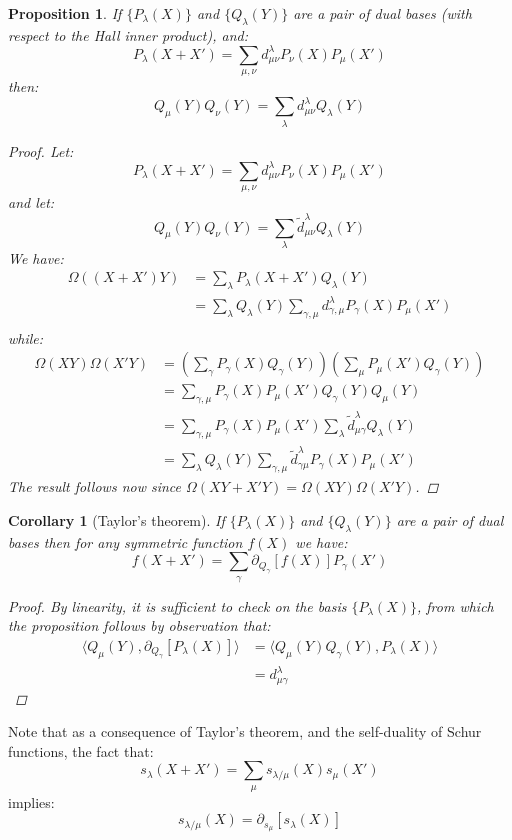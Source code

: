 \documentclass[12pt,dvips]{amsart}
\newtheorem{corollary}{Corollary}[section]
\newtheorem{proposition}{Proposition}[section]
\begin{document}
\begin{proposition} \label{dual}
If $\{P_\lambda(X)\}$ and $\{Q_\lambda(Y)\}$ are a pair of dual bases (with respect to the Hall inner product), and:
$$ P_\lambda(X + X') = \sum_{\mu, \nu} d^{\lambda}_{\mu \nu} P_\nu(X) P_\mu(X') $$
then:
$$ Q_\mu(Y) Q_\nu(Y) = \sum_\lambda d^{\lambda}_{\mu \nu} Q_\lambda(Y)$$

\begin{proof}
Let:
$$ P_\lambda(X + X') = \sum_{\mu, \nu} d^{\lambda}_{\mu \nu} P_\nu(X) P_\mu(X') $$
and let:
$$ Q_\mu(Y) Q_\nu(Y) = \sum_\lambda \tilde{d}^{\lambda}_{\mu \nu} Q_\lambda(Y)$$
We have:
\begin{align*}
\Omega((X + X')Y) & =  \sum_\lambda P_\lambda(X + X') Q_\lambda(Y) \\
& =  \sum_\lambda Q_\lambda(Y) %
\sum_{\gamma, \mu} d^{\lambda}_{\gamma,\mu} P_\gamma(X) P_\mu(X') %
\\
\end{align*}
while:
\begin{align*}
\Omega(XY)\Omega(X'Y) & =  \left ( \sum_\gamma P_\gamma(X) Q_\gamma(Y) \right ) \left ( \sum_\mu P_\mu(X') Q_\gamma(Y) \right ) \\
& =  \sum_{\gamma, \mu} P_\gamma(X) P_\mu(X') Q_\gamma(Y) Q_\mu(Y) \\
& =  \sum_{\gamma, \mu} P_\gamma(X) P_\mu(X') \sum_\lambda \tilde{d}^{\lambda}_{\mu \gamma} Q_\lambda(Y) \\
& =  \sum_\lambda Q_\lambda(Y) \sum_{\gamma, \mu} \tilde{d}^{\lambda}_{\gamma \mu} P_\gamma(X) P_\mu(X')
\end{align*}
The result follows now since $\Omega(XY + X'Y) = \Omega(XY)\Omega(X'Y)$.
\end{proof}
\end{proposition}

\begin{corollary}[Taylor's theorem]
If $\{P_\lambda(X)\}$ and $\{ Q_\lambda(Y) \}$ are a pair of dual bases then for any symmetric function $f(X)$ we have:
$$ f(X + X') = \sum_\gamma \partial_{Q_\gamma}[f(X)] P_\gamma(X') $$
\begin{proof}
By linearity, it is sufficient to check on the basis $\{P_\lambda(X)\}$, from which the proposition follows by observation that:
\begin{align*}
\langle Q_\mu(Y), \partial_{Q_\gamma}[P_\lambda(X)] \rangle
& =  \langle Q_\mu(Y) Q_\gamma(Y), P_\lambda(X) \rangle \\
& =  d^{\lambda}_{\mu \gamma}
\end{align*}
\qedhere
\end{proof}
\end{corollary}
\noindent
Note that as a consequence of Taylor's theorem, and the self-duality of Schur functions, the fact that:
$$ s_\lambda(X + X') = \sum_{\mu} s_{\lambda / \mu}(X) s_\mu(X')$$
implies:
$$ s_{\lambda / \mu}(X) = \partial_{s_\mu}[s_\lambda(X)] $$
\end{document}
